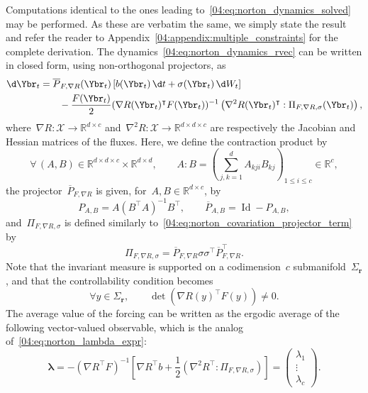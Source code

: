     Computations identical to the ones leading to~\eqref{04:eq:norton_dynamics_solved} may be performed. As these are verbatim the same, we simply state the result and refer the reader to Appendix~\ref{04:appendix:multiple_constraints} for the complete derivation. The dynamics~\eqref{04:eq:norton_dynamics_rvec} can be written in closed form, using non-orthogonal projectors, as
    \begin{equation}
    \label{04:eq:norton_multiple_constraints}
        \begin{aligned}
        \d \Ybr_t &=\overline{P}_{F,\nabla R}(\Ybr_t)\left[b(\Ybr_t)\,\d t +\sigma(\Ybr_t)\,\d W_t\right]\\
        &\qquad- \frac{F(\Ybr_t)}2(\nabla R(\Ybr_t)^\intercal F(\Ybr_t))^{-1}\left(\nabla^2 R(\Ybr_t)^\intercal: \Pi_{F,\nabla R,\sigma}(\Ybr_t)\right),
    \end{aligned}
    \end{equation}
    where~$\nabla R : \mathcal X\to \mathbb{R}^{d\times c}$ and~$\nabla^2 R: \mathcal X \to \mathbb{R}^{d\times d\times c}$ are respectively the Jacobian and Hessian matrices of the fluxes. Here, we define the contraction product by
    \[\forall\, (A,B)\in \mathbb{R}^{d\times d\times c}\times\mathbb{R}^{d\times d},\qquad A:B = \left(\sum_{j,k=1}^d A_{kji}B_{kj}\right)_{1\leq i\leq c}\in\mathbb{R}^c,\]
    the projector~$\overline{P}_{F,\nabla R}$ is given, for~$A,B\in \mathbb{R}^{d\times c}$, by
    \[P_{A,B} = A(B^\intercal A)^{-1}B^\intercal,\qquad \overline{P}_{A,B} = \operatorname{Id}-P_{A,B},\]
    and~$\Pi_{F,\nabla R,\sigma}$ is defined similarly to~\eqref{04:eq:norton_covariation_projector_term} by
    \begin{equation*}
            \Pi_{F,\nabla R,\sigma}=\overline{P}_{F,\nabla R} \sigma\sigma ^\intercal \overline{P}_{F,\nabla R}^\intercal.
    \end{equation*}
    Note that the invariant measure is supported on a codimension~$c$ submanifold~$\Sigma_{\mathbf{r}}$, and that the controllability condition becomes
    \begin{equation}
        \forall y\in \Sigma_{\mathbf{r}},\qquad\operatorname{det}(\nabla R(y)^\intercal F(y)) \neq 0.
    \end{equation}
    The average value of the forcing can be written as the ergodic average of the following vector-valued observable, which is the analog of~\eqref{04:eq:norton_lambda_expr}:
    \begin{equation}
        \boldsymbol{\lambda} = -(\nabla R^\intercal F)^{-1}\left[\nabla R^\intercal b + \frac12\left(\nabla^2 R^\intercal: \Pi_{F,\nabla R,\sigma}\right)\right] = \begin{pmatrix} \lambda_1\\\vdots\\\lambda_c\end{pmatrix}.
    \end{equation}

